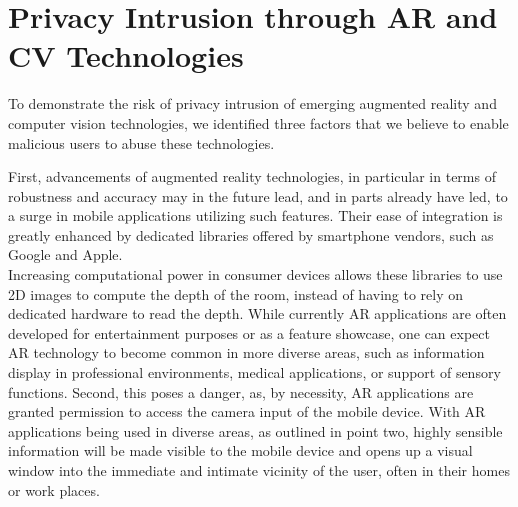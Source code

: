 
\section{Privacy Intrusion through AR and CV Technologies}

To demonstrate the risk of privacy intrusion of emerging augmented reality and computer vision technologies, we identified three factors that we believe to enable malicious users to abuse these technologies.

First, advancements of augmented reality technologies, in particular in terms of robustness and accuracy may in the future lead, and in parts already have led, to a surge in mobile applications utilizing such features.
Their ease of integration is greatly enhanced by dedicated libraries offered by smartphone vendors, such as Google and Apple.\\
Increasing computational power in consumer devices allows these libraries to use 2D images to compute the depth of the room, instead of having to rely on dedicated hardware to read the depth.
While currently AR applications are often developed for entertainment purposes or as a feature showcase, one can expect AR technology to become common in more diverse areas, such as information display in professional environments, medical applications, or support of sensory functions.
Second, this poses a danger, as, by necessity, AR applications are granted permission to access the camera input of the mobile device.
With AR applications being used in diverse areas, as outlined in point two, highly sensible information will be made visible to the mobile device and opens up a visual window into the immediate and intimate vicinity of the user, often in their homes or work places.\\

